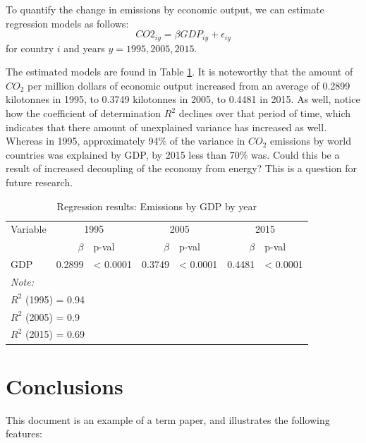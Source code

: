 \documentclass[]{elsarticle} %
\begin{document}
To quantify the change in emissions by economic output, we can estimate
regression models as follows: \[
CO2_{iy} = \beta GDP_{iy} + \epsilon_{iy}
\] for country \(i\) and years \(y=1995, 2005, 2015\).

The estimated models are found in Table
\ref{tab:gdp-emissions-model-results}. It is noteworthy that the amount
of \(CO_2\) per million dollars of economic output increased from an
average of 0.2899 kilotonnes in 1995, to 0.3749 kilotonnes in 2005, to
0.4481 in 2015. As well, notice how the coefficient of determination
\(R^2\) declines over that period of time, which indicates that there
amount of unexplained variance has increased as well. Whereas in 1995,
approximately 94\% of the variance in \(CO_2\) emissions by world
countries was explained by GDP, by 2015 less than 70\% was. Could this
be a result of increased decoupling of the economy from energy? This is
a question for future research.

\begin{table}

\caption{\label{tab:table-emissions-models-results}\label{tab:gdp-emissions-model-results} Regression results: Emissions by GDP by year}
\centering
\begin{tabular}[t]{lrlrlrl}
\toprule
\multicolumn{1}{c}{Variable} & \multicolumn{2}{c}{1995} & \multicolumn{2}{c}{2005} & \multicolumn{2}{c}{2015} \\
\cmidrule(l{3pt}r{3pt}){1-1} \cmidrule(l{3pt}r{3pt}){2-3} \cmidrule(l{3pt}r{3pt}){4-5} \cmidrule(l{3pt}r{3pt}){6-7}
  & $\beta$ & p-val & $\beta$ & p-val & $\beta$ & p-val\\
\midrule
GDP & 0.2899 & < 0.0001 & 0.3749 & < 0.0001 & 0.4481 & < 0.0001\\
\bottomrule
\multicolumn{7}{l}{\textit{Note: }}\\
\multicolumn{7}{l}{$R^2$ (1995) =  0.94}\\
\multicolumn{7}{l}{$R^2$ (2005) =  0.9}\\
\multicolumn{7}{l}{$R^2$ (2015) =  0.69}\\
\end{tabular}
\end{table}

\hypertarget{conclusions}{%
\section{Conclusions}\label{conclusions}}

This document is an example of a term paper, and illustrates the
following features:
\end{document}
